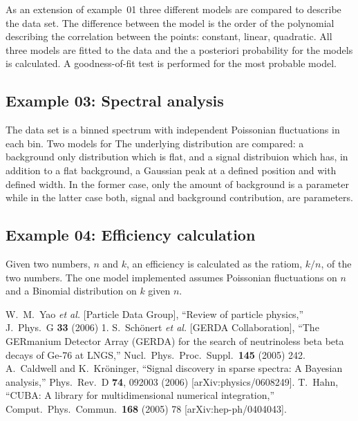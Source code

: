 \documentclass[11pt, a4paper]{article}
\begin{document}
As an extension of example~01 three different models are compared to
describe the data set. The difference between the model is the order
of the polynomial describing the correlation between the points:
constant, linear, quadratic. All three models are fitted to the data
and the a posteriori probability for the models is calculated. A
goodness-of-fit test is performed for the most probable model.


\subsection{Example 03: Spectral analysis} 
\label{section:example03} 

The data set is a binned spectrum with independent Poissonian
fluctuations in each bin. Two models for The underlying distribution
are compared: a background only distribution which is flat, and a
signal distribuion which has, in addition to a flat background, a
Gaussian peak at a defined position and with defined width. In the
former case, only the amount of background is a parameter while in the
latter case both, signal and background contribution, are parameters. 


\subsection{Example 04: Efficiency calculation} 

Given two numbers, $n$ and $k$, an efficiency is calculated as the
ratiom, $k/n$, of the two numbers. The one model implemented assumes
Poissonian fluctuations on $n$ and a Binomial distribution on $k$
given $n$. 



\begin{thebibliography}{99}
%
  W.~M.~Yao {\it et al.}  [Particle Data Group],
  ``Review of particle physics,''
  J.\ Phys.\ G {\bf 33} (2006) 1.
%
  S.~Sch{\"o}nert {\it et al.}  [GERDA Collaboration],
  ``The GERmanium Detector Array (GERDA) for the search of neutrinoless beta
  beta decays of Ge-76 at LNGS,''
  Nucl.\ Phys.\ Proc.\ Suppl.\  {\bf 145} (2005) 242.
%
  A.~Caldwell and K.~Kr{\"o}ninger,
  ``Signal discovery in sparse spectra: A Bayesian analysis,''
  Phys.\ Rev.\  D {\bf 74}, 092003 (2006)
  [arXiv:physics/0608249].
%
  T.~Hahn, ``CUBA: A library for multidimensional numerical
  integration,'' Comput.\ Phys.\ Commun.\ {\bf 168} (2005) 78
  [arXiv:hep-ph/0404043].
\end{thebibliography}
\end{document}
